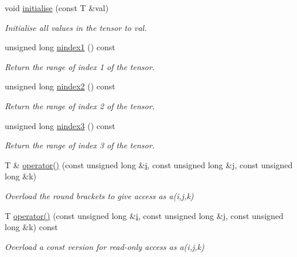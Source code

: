 \begin{DoxyCompactItemize}
void \hyperlink{classoomph_1_1RankThreeTensor_ad63ed4eef146b20783c1df45584f0847}{initialise} (const T \&val)
\begin{DoxyCompactList}\small\item\em Initialise all values in the tensor to val. \end{DoxyCompactList}\item 
unsigned long \hyperlink{classoomph_1_1RankThreeTensor_a6efa48062b66970a12ac5bc712d8704b}{nindex1} () const
\begin{DoxyCompactList}\small\item\em Return the range of index 1 of the tensor. \end{DoxyCompactList}\item 
unsigned long \hyperlink{classoomph_1_1RankThreeTensor_a7934dad6cda9e9716c086cd15ee05dad}{nindex2} () const
\begin{DoxyCompactList}\small\item\em Return the range of index 2 of the tensor. \end{DoxyCompactList}\item 
unsigned long \hyperlink{classoomph_1_1RankThreeTensor_ac8c7eb798506698c0e231557af26310d}{nindex3} () const
\begin{DoxyCompactList}\small\item\em Return the range of index 3 of the tensor. \end{DoxyCompactList}\item 
T \& \hyperlink{classoomph_1_1RankThreeTensor_ae5180883710cddbc2de5929df147bed5}{operator()} (const unsigned long \&\hyperlink{cfortran_8h_adb50e893b86b3e55e751a42eab3cba82}{i}, const unsigned long \&j, const unsigned long \&k)
\begin{DoxyCompactList}\small\item\em Overload the round brackets to give access as a(i,j,k) \end{DoxyCompactList}\item 
T \hyperlink{classoomph_1_1RankThreeTensor_aa97b7b4cb4b619c24ef9abebcd0d892c}{operator()} (const unsigned long \&\hyperlink{cfortran_8h_adb50e893b86b3e55e751a42eab3cba82}{i}, const unsigned long \&j, const unsigned long \&k) const
\begin{DoxyCompactList}\small\item\em Overload a const version for read-\/only access as a(i,j,k) \end{DoxyCompactList}\end{DoxyCompactItemize}

